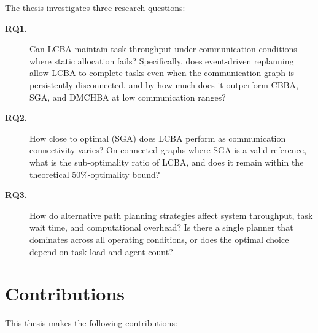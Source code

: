 The thesis investigates three research questions:

\begin{description}
  \item[\textbf{RQ1.}] Can LCBA maintain task throughput under communication
    conditions where static allocation fails?
    Specifically, does event-driven replanning allow LCBA to complete tasks
    even when the communication graph is persistently disconnected, and by how
    much does it outperform CBBA, SGA, and DMCHBA at low communication ranges?

  \item[\textbf{RQ2.}] How close to optimal (SGA) does LCBA perform as
    communication connectivity varies?
    On connected graphs where SGA is a valid reference, what is the
    sub-optimality ratio of LCBA, and does it remain within the theoretical
    50\%-optimality bound?

  \item[\textbf{RQ3.}] How do alternative path planning strategies affect
    system throughput, task wait time, and computational overhead?
    Is there a single planner that dominates across all operating conditions,
    or does the optimal choice depend on task load and agent count?
\end{description}


\section{Contributions}
\label{sec:intro_contributions}

This thesis makes the following contributions:

